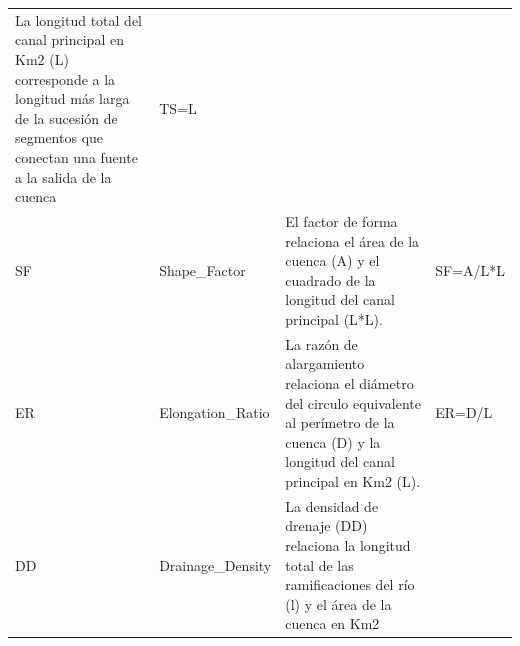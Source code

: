 \documentclass[11pt,]{article}
\begin{document}
\begin{longtable}[]{@{}llll@{}}
\begin{minipage}[t]{0.44\columnwidth}
La longitud total del canal principal en Km2 (L) corresponde a la
longitud más larga de la sucesión de segmentos que conectan una fuente a
la salida de la cuenca\strut
\end{minipage} & \begin{minipage}[t]{0.12\columnwidth}\raggedright\strut
TS=L\strut
\end{minipage}\tabularnewline
\begin{minipage}[t]{0.08\columnwidth}\raggedright\strut
SF\strut
\end{minipage} & \begin{minipage}[t]{0.25\columnwidth}\raggedright\strut
Shape\_Factor\strut
\end{minipage} & \begin{minipage}[t]{0.44\columnwidth}\raggedright\strut
El factor de forma relaciona el área de la cuenca (A) y el cuadrado de
la longitud del canal principal (L*L).\strut
\end{minipage} & \begin{minipage}[t]{0.12\columnwidth}\raggedright\strut
SF=A/L*L\strut
\end{minipage}\tabularnewline
\begin{minipage}[t]{0.08\columnwidth}\raggedright\strut
ER\strut
\end{minipage} & \begin{minipage}[t]{0.25\columnwidth}\raggedright\strut
Elongation\_Ratio\strut
\end{minipage} & \begin{minipage}[t]{0.44\columnwidth}\raggedright\strut
La razón de alargamiento relaciona el diámetro del circulo equivalente
al perímetro de la cuenca (D) y la longitud del canal principal en Km2
(L).\strut
\end{minipage} & \begin{minipage}[t]{0.12\columnwidth}\raggedright\strut
ER=D/L\strut
\end{minipage}\tabularnewline
\begin{minipage}[t]{0.08\columnwidth}\raggedright\strut
DD\strut
\end{minipage} & \begin{minipage}[t]{0.25\columnwidth}\raggedright\strut
Drainage\_Density\strut
\end{minipage} & \begin{minipage}[t]{0.44\columnwidth}\raggedright\strut
La densidad de drenaje (DD) relaciona la longitud total de las
ramificaciones del río (l) y el área de la cuenca en Km2\strut
\end{minipage} & \begin{minipage}[t]{0.12\columnwidth}\raggedright\strut

\end{minipage}
\end{longtable}
\end{document}
